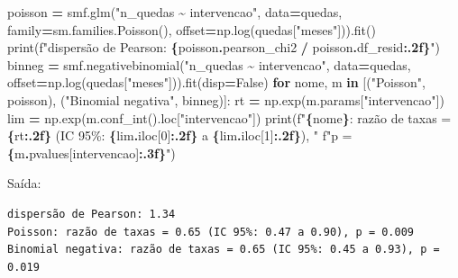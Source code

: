 \documentclass[
]{book}
\newenvironment{Shaded}{\begin{snugshade}}{\end{snugshade}}
\newcommand{\BuiltInTok}[1]{#1}
\newcommand{\ControlFlowTok}[1]{\textcolor[rgb]{0.13,0.29,0.53}{\textbf{#1}}}
\newcommand{\DecValTok}[1]{\textcolor[rgb]{0.00,0.00,0.81}{#1}}
\newcommand{\KeywordTok}[1]{\textcolor[rgb]{0.13,0.29,0.53}{\textbf{#1}}}
\newcommand{\NormalTok}[1]{#1}
\newcommand{\OperatorTok}[1]{\textcolor[rgb]{0.81,0.36,0.00}{\textbf{#1}}}
\newcommand{\SpecialCharTok}[1]{\textcolor[rgb]{0.81,0.36,0.00}{\textbf{#1}}}
\newcommand{\SpecialStringTok}[1]{\textcolor[rgb]{0.31,0.60,0.02}{#1}}
\newcommand{\StringTok}[1]{\textcolor[rgb]{0.31,0.60,0.02}{#1}}
\newcommand{\VariableTok}[1]{\textcolor[rgb]{0.00,0.00,0.00}{#1}}
\begin{document}
\begin{Shaded}
\begin{Highlighting}[]
\NormalTok{poisson }\OperatorTok{=}\NormalTok{ smf.glm(}\StringTok{"n\_quedas \textasciitilde{} intervencao"}\NormalTok{, data}\OperatorTok{=}\NormalTok{quedas, family}\OperatorTok{=}\NormalTok{sm.families.Poisson(),}
\NormalTok{                  offset}\OperatorTok{=}\NormalTok{np.log(quedas[}\StringTok{"meses"}\NormalTok{])).fit()}
\BuiltInTok{print}\NormalTok{(}\SpecialStringTok{f"dispersão de Pearson: }\SpecialCharTok{\{}\NormalTok{poisson}\SpecialCharTok{.}\NormalTok{pearson\_chi2 }\OperatorTok{/}\NormalTok{ poisson}\SpecialCharTok{.}\NormalTok{df\_resid}\SpecialCharTok{:.2f\}}\SpecialStringTok{"}\NormalTok{)}
\NormalTok{binneg }\OperatorTok{=}\NormalTok{ smf.negativebinomial(}\StringTok{"n\_quedas \textasciitilde{} intervencao"}\NormalTok{, data}\OperatorTok{=}\NormalTok{quedas,}
\NormalTok{                              offset}\OperatorTok{=}\NormalTok{np.log(quedas[}\StringTok{"meses"}\NormalTok{])).fit(disp}\OperatorTok{=}\VariableTok{False}\NormalTok{)}
\ControlFlowTok{for}\NormalTok{ nome, m }\KeywordTok{in}\NormalTok{ [(}\StringTok{"Poisson"}\NormalTok{, poisson), (}\StringTok{"Binomial negativa"}\NormalTok{, binneg)]:}
\NormalTok{    rt }\OperatorTok{=}\NormalTok{ np.exp(m.params[}\StringTok{"intervencao"}\NormalTok{])}
\NormalTok{    lim }\OperatorTok{=}\NormalTok{ np.exp(m.conf\_int().loc[}\StringTok{"intervencao"}\NormalTok{])}
    \BuiltInTok{print}\NormalTok{(}\SpecialStringTok{f"}\SpecialCharTok{\{}\NormalTok{nome}\SpecialCharTok{\}}\SpecialStringTok{: razão de taxas = }\SpecialCharTok{\{}\NormalTok{rt}\SpecialCharTok{:.2f\}}\SpecialStringTok{ (IC 95\%: }\SpecialCharTok{\{}\NormalTok{lim}\SpecialCharTok{.}\NormalTok{iloc[}\DecValTok{0}\NormalTok{]}\SpecialCharTok{:.2f\}}\SpecialStringTok{ a }\SpecialCharTok{\{}\NormalTok{lim}\SpecialCharTok{.}\NormalTok{iloc[}\DecValTok{1}\NormalTok{]}\SpecialCharTok{:.2f\}}\SpecialStringTok{), "}
          \SpecialStringTok{f"p = }\SpecialCharTok{\{}\NormalTok{m}\SpecialCharTok{.}\NormalTok{pvalues[}\StringTok{\textquotesingle{}intervencao\textquotesingle{}}\NormalTok{]}\SpecialCharTok{:.3f\}}\SpecialStringTok{"}\NormalTok{)}
\end{Highlighting}
\end{Shaded}

Saída:

\begin{verbatim}
dispersão de Pearson: 1.34
Poisson: razão de taxas = 0.65 (IC 95%: 0.47 a 0.90), p = 0.009
Binomial negativa: razão de taxas = 0.65 (IC 95%: 0.45 a 0.93), p = 0.019
\end{verbatim}
\end{document}
